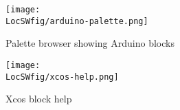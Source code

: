 \begin{figure}
      \centering
      \texttt{[image: \\LocSWfig/arduino-palette.png]}
      \caption{Palette browser showing Arduino blocks}
      \label{arduino-palette}
\end{figure}

\begin{figure}
      \centering
      \texttt{[image: \\LocSWfig/xcos-help.png]}
      \caption{Xcos block help}
      \label{blk-help}
\end{figure}
